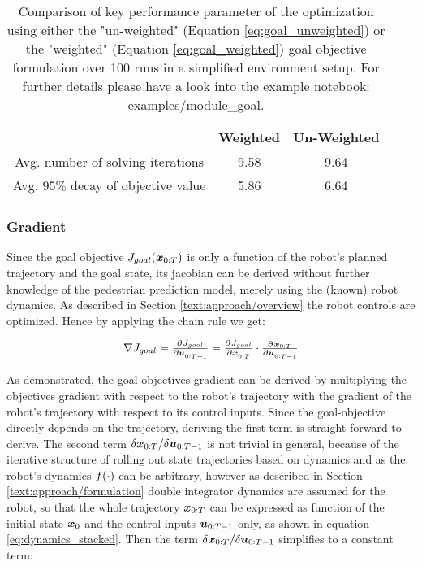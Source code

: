 \begin{table}[!ht]
\begin{center}
\begin{tabular}{c|c|c}
 & Weighted & Un-Weighted \\
\hline
Avg. number of solving iterations & 9.58 & 9.64 \\
\hline
Avg. $95 \%$ decay of objective value & 5.86 & 6.64 \\
\end{tabular}
\caption{Comparison of key performance parameter of the optimization using either the "un-weighted" (Equation \ref{eq:goal_unweighted}) or the "weighted" (Equation  \ref{eq:goal_weighted}) goal objective formulation over 100 runs in a simplified environment setup. For further details please have a look into the example notebook: \href{https://github.com/simon-schaefer/mantrap/blob/master/examples/module_goal.ipynb}{examples/module\_goal}.}
\label{table:goal_horizon_weighting}
\end{center}
\end{table}

\subsubsection{Gradient}
Since the goal objective $J_{goal}(\boldsymbol{x}_{0:T})$ is only a function of the robot's planned trajectory and the goal state, its jacobian can be derived without further knowledge of the pedestrian prediction model, merely using the (known) robot dynamics. As described in Section \ref{text:approach/overview} the robot controls are optimized. Hence by applying the chain rule we get: 

\begin{equation}
\nabla J_{goal} = \pd{J_{goal}}{\u_{0:T-1}} = \pd{J_{goal}}{\x_{0:T}} \cdot \pd{\x_{0:T}}{\u_{0:T-1}}
\end{equation}

As demonstrated, the goal-objectives gradient can be derived by multiplying the objectives gradient with respect to the robot's trajectory with the gradient of the robot's trajectory with respect to its control inputs. Since the goal-objective directly depends on the trajectory, deriving the first term is straight-forward to derive. The second term $\delta \boldsymbol{x}_{0:T} / \delta \boldsymbol{u}_{0:T-1}$ is not trivial in general, because of the iterative structure of rolling out state trajectories based on dynamics and as the robot's dynamics $f(\cdot)$ can be arbitrary, however as described in Section \ref{text:approach/formulation} double integrator dynamics are assumed for the robot, so that the whole trajectory $\boldsymbol{x}_{0:T}$ can be expressed as function of the initial state $\boldsymbol{x}_0$ and the control inputs $\boldsymbol{u}_{0:T-1}$ only, as shown in equation \ref{eq:dynamics_stacked}. Then the term $\delta \boldsymbol{x}_{0:T} / \delta \boldsymbol{u}_{0:T-1}$ simplifies to a constant term:

